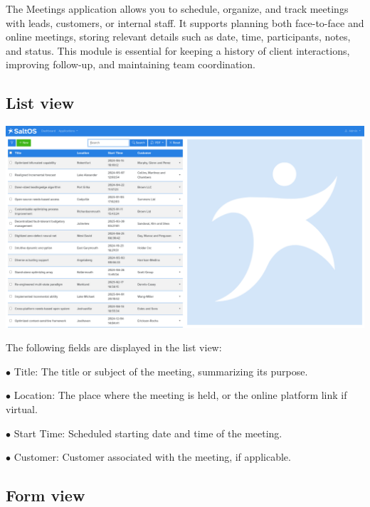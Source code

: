 \documentclass[a4paper]{article}
\begin{document}
The Meetings application allows you to schedule, organize, and track meetings with leads, customers, or internal staff.
It supports planning both face-to-face and online meetings, storing relevant details such as date, time, participants, notes, and status.
This module is essential for keeping a history of client interactions, improving follow-up, and maintaining team coordination.

\hypertarget{toc68}{}
\subsection{List view}

\begin{center}\includegraphics[width=1\textwidth]{../ujest/snaps/test-screenshots-js-screenshots-crm-meetings-list-en-us-1-snap.png}\end{center}

The following fields are displayed in the list view:

\begin{compactitem}
\item[\color{myblue}$\bullet$] Title: The title or subject of the meeting, summarizing its purpose.
\item[\color{myblue}$\bullet$] Location: The place where the meeting is held, or the online platform link if virtual.
\item[\color{myblue}$\bullet$] Start Time: Scheduled starting date and time of the meeting.
\item[\color{myblue}$\bullet$] Customer: Customer associated with the meeting, if applicable.
\end{compactitem}

\hypertarget{toc69}{}
\subsection{Form view}
\end{document}
